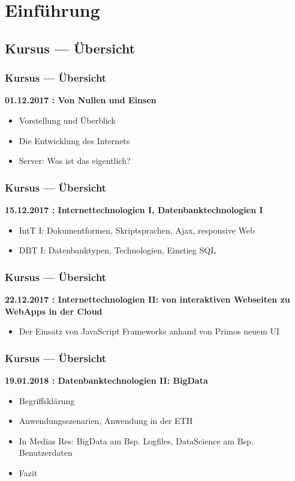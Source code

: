 \section{Einführung}
  
  \subsection{Kursus --- Übersicht}
  \begin{frame}
    \frametitle<presentation>{Kursus --- Übersicht}
      \textbf{01.12.2017 : Von Nullen und Einsen}
      \begin{itemize}
        \item Vorstellung und Überblick
        \item Die Entwicklung des Internets
        \item Server: Was ist das eigentlich?
      \end{itemize}
  \end{frame}

  \begin{frame}
    \frametitle<presentation>{Kursus --- Übersicht}
      \textbf{15.12.2017 : Internettechnologien I, Datenbanktechnologien I}
      \begin{itemize}
        \item IntT I: Dokumentformen, Skriptsprachen, Ajax, responsive Web
        \item DBT I: Datenbanktypen, Technologien, Einstieg SQL
      \end{itemize}
  \end{frame}

  \begin{frame}
    \frametitle<presentation>{Kursus --- Übersicht}
      \textbf{22.12.2017 : Internettechnologien II: von interaktiven Webseiten zu WebApps in der Cloud} 
      \begin{itemize}
        \item Der Einsatz von JavaScript Frameworks anhand von Primos neuem UI
      \end{itemize}
  \end{frame}

  \begin{frame}
    \frametitle<presentation>{Kursus --- Übersicht}
      \textbf{19.01.2018 : Datenbanktechnologien II: BigData}
      \begin{itemize}
        \item Begriffsklärung
        \item Anwendungsszenarien, Anwendung in der ETH
        \item In Medias Res: BigData am Bsp. Logfiles, DataScience am Bsp. Benutzerdaten
        \item Fazit
      \end{itemize}
  \end{frame}

